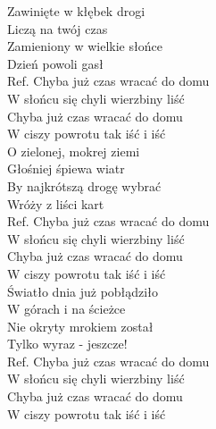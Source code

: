 
\begin{flushleft}
Zawinięte w kłębek drogi \tab{} \\
Liczą na twój czas \tab{}\\
Zamieniony w wielkie słońce \tab{}\\
Dzień powoli gasł \tab{}\\
\vskip 3mm
Ref. Chyba już czas wracać do domu \\
\hspace{0.9cm}W słońcu się chyli wierzbiny liść \\
\hspace{0.9cm}Chyba już czas wracać do domu \\
\hspace{0.9cm}W ciszy powrotu tak iść i iść \\
\vskip 3mm
O zielonej, mokrej ziemi \\
Głośniej śpiewa wiatr \\
By najkrótszą drogę wybrać \\
Wróży z liści kart \\
\vskip 3mm
Ref. Chyba już czas wracać do domu \\
\hspace{0.9cm}W słońcu się chyli wierzbiny liść \\
\hspace{0.9cm}Chyba już czas wracać do domu \\
\hspace{0.9cm}W ciszy powrotu tak iść i iść \\
\vskip 3mm
Światło dnia już pobłądziło \\
W górach i na ścieżce \\
Nie okryty mrokiem został \\
Tylko wyraz - jeszcze! \\
\vskip 3mm
Ref. Chyba już czas wracać do domu \\
\hspace{0.9cm}W słońcu się chyli wierzbiny liść \\
\hspace{0.9cm}Chyba już czas wracać do domu \\
\hspace{0.9cm}W ciszy powrotu tak iść i iść \\
\end{flushleft}
\clearpage
